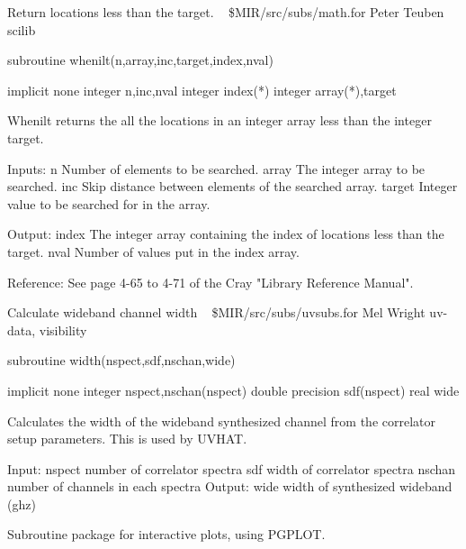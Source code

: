%
\noindent Return locations less than the target.
\newline \ 
\newline {} \$MIR/src/subs/math.for
\newline {} Peter Teuben
\newline {} scilib
\par{\tenpoint
{\eightpoint\begintt
        subroutine whenilt(n,array,inc,target,index,nval)

        implicit none
        integer n,inc,nval
        integer index(*)
        integer array(*),target

  Whenilt returns the all the locations in an integer array less than the
  integer target.

  Inputs:
    n          Number of elements to be searched.
    array      The integer array to be searched.
    inc        Skip distance between elements of the searched array.
    target     Integer value to be searched for in the array.

  Output:
    index      The integer array containing the index of locations
               less than the target.
    nval       Number of values put in the index array.

  Reference:
  See page 4-65 to 4-71 of the Cray "Library Reference Manual".
\endtt}
\par}
%
\noindent Calculate wideband channel width
\newline \ 
\newline {} \$MIR/src/subs/uvsubs.for
\newline {} Mel Wright
\newline \abox{Keywords:} uv-data, visibility
\par{\tenpoint
{\eightpoint\begintt
        subroutine width(nspect,sdf,nschan,wide)

        implicit none
        integer nspect,nschan(nspect)
        double precision sdf(nspect)
        real wide

  Calculates the width of the wideband synthesized channel from
  the correlator setup parameters.  This is used by UVHAT.

  Input:
    nspect     number of correlator spectra
    sdf        width of correlator spectra
    nschan     number of channels in each spectra
  Output:
    wide       width of synthesized wideband (ghz)
\endtt}
\par}
%
\noindent Subroutine package for interactive plots, using PGPLOT.
